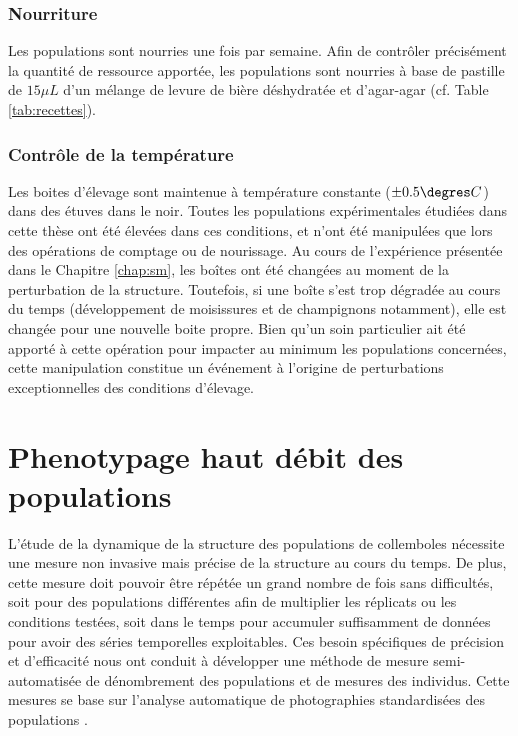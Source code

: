 \subsubsection{Nourriture}

Les populations sont nourries une fois par semaine. Afin de contrôler
précisément la quantité de ressource apportée, les populations sont nourries à
base de pastille de $15\mu L$ d'un mélange de levure de bière déshydratée et
d'agar-agar (cf. Table \ref{tab:recettes}). 

\subsubsection{Contrôle de la température}

Les boites d'élevage sont maintenue à température constante ($\pm 0.5\degres C$)
dans des étuves dans le noir. Toutes les populations expérimentales étudiées
dans cette thèse ont été élevées dans ces conditions, et n'ont été manipulées
que lors des opérations de comptage ou de nourissage. Au cours de l'expérience
présentée dans le Chapitre \ref{chap:sm}, les boîtes ont été changées au moment
de la perturbation de la structure. Toutefois, si une boîte s'est trop
dégradée au cours du temps (développement de moisissures et de
champignons notamment), elle est changée pour une nouvelle boite
propre. Bien qu'un soin particulier ait été apporté à cette opération pour
impacter au minimum les populations concernées, cette manipulation constitue un
événement à l'origine de perturbations exceptionnelles des conditions d'élevage. 

\section{Phenotypage haut débit des populations}

L'étude de la dynamique de la structure des populations de collemboles nécessite
une mesure non invasive mais précise de la structure au cours du temps. De plus,
cette mesure doit pouvoir être répétée un grand nombre de fois sans difficultés,
soit pour des populations différentes afin de multiplier les réplicats ou les
conditions testées, soit dans le temps pour accumuler suffisamment de données
pour avoir des séries temporelles exploitables. Ces besoin spécifiques de
précision et d'efficacité nous ont conduit à développer une méthode de mesure
semi-automatisée de dénombrement des populations et de mesures des individus.
Cette mesures se base sur l'analyse automatique de photographies standardisées
des populations \autocites[Figure
\ref{fig:photocount}, ][]{mallard2012a,mallard2013a}.

